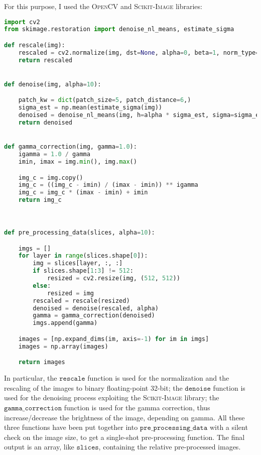 \documentclass{standalone}
\begin{document}
For this purpose, I used the \textsc{OpenCV} \cite{opencv_library} and \textsc{Scikit-Image} \cite{scikit-image} libraries:

\begin{lstlisting}[language = python, caption=pre-processing function implementation]
import cv2
from skimage.restoration import denoise_nl_means, estimate_sigma

def rescale(img):
    rescaled = cv2.normalize(img, dst=None, alpha=0, beta=1, norm_type=cv2.NORM_MINMAX, dtype=cv2.CV_32F)
    return rescaled


def denoise(img, alpha=10):

    patch_kw = dict(patch_size=5, patch_distance=6,)
    sigma_est = np.mean(estimate_sigma(img))
    denoised = denoise_nl_means(img, h=alpha * sigma_est, sigma=sigma_est, fast_mode=True, **patch_kw)
    return denoised


def gamma_correction(img, gamma=1.0):
    igamma = 1.0 / gamma
    imin, imax = img.min(), img.max()

    img_c = img.copy()
    img_c = ((img_c - imin) / (imax - imin)) ** igamma
    img_c = img_c * (imax - imin) + imin
    return img_c



def pre_processing_data(slices, alpha=10):

    imgs = []
    for layer in range(slices.shape[0]):
        img = slices[layer, :, :]
        if slices.shape[1:3] != 512:
            resized = cv2.resize(img, (512, 512))
        else:
            resized = img
        rescaled = rescale(resized)
        denoised = denoise(rescaled, alpha)
        gamma = gamma_correction(denoised)
        imgs.append(gamma)

    images = [np.expand_dims(im, axis=-1) for im in imgs]
    images = np.array(images)

    return images

\end{lstlisting}

In particular, the $\mathtt{rescale}$ function is used for the normalization and the rescaling of the images to binary floating-point 32-bit; the $\mathtt{denoise}$ function is used for the denoising process exploiting the \textsc{Scikit-Image} library; the $\mathtt{gamma\_correction}$ function is used for the gamma correction, thus increase/decrease the brightness of the image, depending on gamma.
All these three functions have been put together into $\mathtt{pre\_processing\_data}$ with a silent check on the image size, to get a single-shot pre-processing function.
The final output is an array, like $\mathtt{slices}$, containing the relative pre-processed images.
\end{document}
